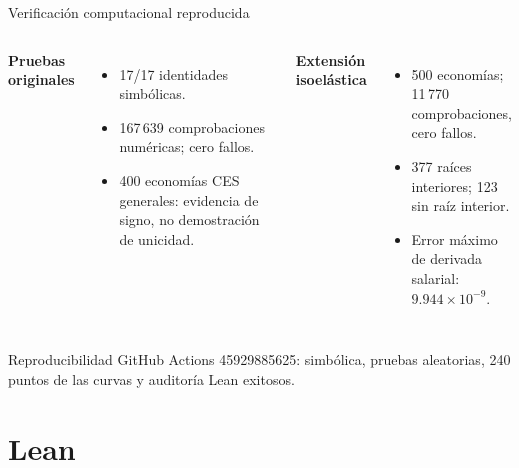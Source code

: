 \documentclass[aspectratio=169,10pt]{beamer}
\begin{document}
\begin{frame}{Verificación computacional reproducida}
\small
\begin{columns}[T]
\textbf{Pruebas originales}
\begin{itemize}
\item 17/17 identidades simbólicas.
\item 167\,639 comprobaciones numéricas; cero fallos.
\item 400 economías CES generales: evidencia de signo, no demostración de unicidad.
\end{itemize}
\textbf{Extensión isoelástica}
\begin{itemize}
\item 500 economías; 11\,770 comprobaciones, cero fallos.
\item 377 raíces interiores; 123 sin raíz interior.
\item Error máximo de derivada salarial: $9.944\times10^{-9}$.
\end{itemize}
\end{columns}
\begin{block}{Reproducibilidad}
GitHub Actions 45929885625: simbólica, pruebas aleatorias, 240 puntos de las curvas y auditoría Lean exitosos.
\end{block}
\end{frame}

\section{Lean}
\end{document}
